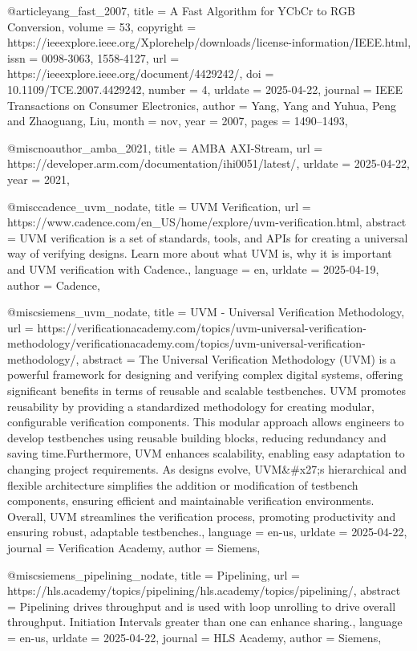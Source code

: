 @article{yang_fast_2007,
	title = {A {Fast} {Algorithm} for {YCbCr} to {RGB} {Conversion}},
	volume = {53},
	copyright = {https://ieeexplore.ieee.org/Xplorehelp/downloads/license-information/IEEE.html},
	issn = {0098-3063, 1558-4127},
	url = {https://ieeexplore.ieee.org/document/4429242/},
	doi = {10.1109/TCE.2007.4429242},
	number = {4},
	urldate = {2025-04-22},
	journal = {IEEE Transactions on Consumer Electronics},
	author = {Yang, Yang and Yuhua, Peng and Zhaoguang, Liu},
	month = nov,
	year = {2007},
	pages = {1490--1493},
}

@misc{noauthor_amba_2021,
	title = {{AMBA} {AXI}-{Stream}},
	url = {https://developer.arm.com/documentation/ihi0051/latest/},
	urldate = {2025-04-22},
	year = {2021},
}

@misc{cadence_uvm_nodate,
	title = {{UVM} {Verification}},
	url = {https://www.cadence.com/en_US/home/explore/uvm-verification.html},
	abstract = {UVM verification is a set of standards, tools, and APIs for creating a universal way of verifying designs. Learn more about what UVM is, why it is important and UVM verification with Cadence.},
	language = {en},
	urldate = {2025-04-19},
	author = {{Cadence}},
}

@misc{siemens_uvm_nodate,
	title = {{UVM} - {Universal} {Verification} {Methodology}},
	url = {https://verificationacademy.com/topics/uvm-universal-verification-methodology/verificationacademy.com/topics/uvm-universal-verification-methodology/},
	abstract = {The Universal Verification Methodology (UVM) is a powerful framework for designing and verifying complex digital systems, offering significant benefits in terms of reusable and scalable testbenches. UVM promotes reusability by providing a standardized methodology for creating modular, configurable verification components. This modular approach allows engineers to develop testbenches using reusable building blocks, reducing redundancy and saving time.Furthermore, UVM enhances scalability, enabling easy adaptation to changing project requirements. As designs evolve, UVM\&\#x27;s hierarchical and flexible architecture simplifies the addition or modification of testbench components, ensuring efficient and maintainable verification environments. Overall, UVM streamlines the verification process, promoting productivity and ensuring robust, adaptable testbenches.},
	language = {en-us},
	urldate = {2025-04-22},
	journal = {Verification Academy},
	author = {{Siemens}},
}

@misc{siemens_pipelining_nodate,
	title = {Pipelining},
	url = {https://hls.academy/topics/pipelining/hls.academy/topics/pipelining/},
	abstract = {Pipelining drives throughput and is used with loop unrolling to drive overall throughput. Initiation Intervals greater than one can enhance sharing.},
	language = {en-us},
	urldate = {2025-04-22},
	journal = {HLS Academy},
	author = {{Siemens}},
}

